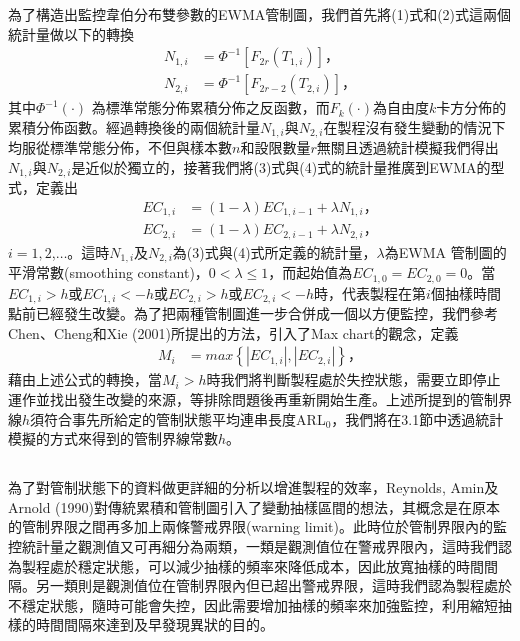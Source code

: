 \documentclass[12pt]{article}  %
\theoremstyle{plain}
\begin{document}
為了構造出監控韋伯分布雙參數的EWMA管制圖，我們首先將(1)式和(2)式這兩個統計量做以下的轉換
\begin{align}
N_{1,i}&=\Phi^{-1}[F_{2r}(T_{1,i})] \mbox{，}\\
N_{2,i}&=\Phi^{-1}[F_{2r-2}(T_{2,i})]\mbox{，}
\end{align}
其中$\Phi^{-1}(\cdot{})$ 為標準常態分佈累積分佈之反函數，而$F_k(\cdot{})$為自由度$k$卡方分佈的累積分佈函數。經過轉換後的兩個統計量$N_{1,i}$與$N_{2,i}$在製程沒有發生變動的情況下均服從標準常態分佈，不但與樣本數$n$和設限數量$r$無關且透過統計模擬我們得出$N_{1,i}$與$N_{2,i}$是近似於獨立的，接著我們將(3)式與(4)式的統計量推廣到EWMA的型式，定義出
\begin{align}
EC_{1,i}&=\left(1-\lambda\right)EC_{1,i-1}+\lambda N_{1,i} \mbox{，}\\
EC_{2,i}&=\left(1-\lambda\right)EC_{2,i-1}+\lambda N_{2,i}\mbox{，}
\end{align}
$i=1,2$,$\ldots$。這時$N_{1,i}$及$N_{2,i}$為(3)式與(4)式所定義的統計量，$\lambda$為EWMA 管制圖的平滑常數(smoothing constant)，$0 < \lambda \leq 1$，而起始值為$EC_{1,0}=EC_{2,0}=0$。當$EC_{1,i}>h$或$EC_{1,i}<-h$或$EC_{2,i}>h$或$EC_{2,i}<-h$時，代表製程在第$i$個抽樣時間點前已經發生改變。為了把兩種管制圖進一步合併成一個以方便監控，我們參考Chen、Cheng和Xie (2001)所提出的方法，引入了Max chart的觀念，定義
\begin{align}
M_{i}&=max\left\{|EC_{1,i}|,|EC_{2,i}|\right\}\mbox{，}
\end{align}
藉由上述公式的轉換，當$M_{i}>h$時我們將判斷製程處於失控狀態，需要立即停止運作並找出發生改變的來源，等排除問題後再重新開始生產。上述所提到的管制界線$h$須符合事先所給定的管制狀態平均連串長度ARL$_0$，我們將在3.1節中透過統計模擬的方式來得到的管制界線常數$h$。

\subsection{}
為了對管制狀態下的資料做更詳細的分析以增進製程的效率，Reynolds, Amin及Arnold (1990)對傳統累積和管制圖引入了變動抽樣區間的想法，其概念是在原本的管制界限之間再多加上兩條警戒界限(warning limit)。此時位於管制界限內的監控統計量之觀測值又可再細分為兩類，一類是觀測值位在警戒界限內，這時我們認為製程處於穩定狀態，可以減少抽樣的頻率來降低成本，因此放寬抽樣的時間間隔。另一類則是觀測值位在管制界限內但已超出警戒界限，這時我們認為製程處於不穩定狀態，隨時可能會失控，因此需要增加抽樣的頻率來加強監控，利用縮短抽樣的時間間隔來達到及早發現異狀的目的。
       
\end{document}

